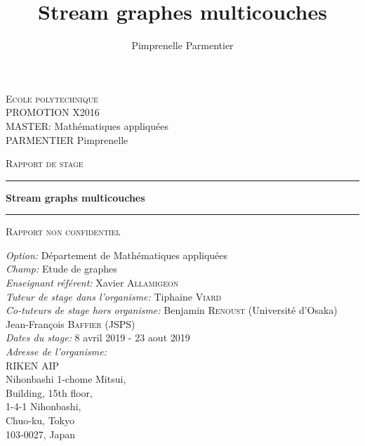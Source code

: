 \documentclass[11pt,a4paper]{article}
\author{Pimprenelle Parmentier}
\title{Stream graphes multicouches}
\theoremstyle{definition}
\theoremstyle{remark}
\theoremstyle{remark}
\def \Stgms {Stream graphs multicouches}
\begin{document}
\begin{titlepage}


\noindent
\textsc{Ecole polytechnique}\\
PROMOTION X2016 \\
MASTER: Mathématiques appliquées\\
PARMENTIER Pimprenelle

\vspace{3cm}
\begin{center}
\textsc{\Large Rapport de stage}
\vspace{1cm}
\hrule %
\vspace{0.4cm}
{\huge \bfseries \Stgms \par}\vspace{0.4cm} %
\hrule 
\vspace{1cm}
\textsc{\Large Rapport non confidentiel}
\vspace{4cm} %
 
\end{center}

\noindent
\textit{Option:} Département de Mathématiques appliquées\\
\textit{Champ:} Etude de graphes\\
\textit{Enseignant référent:} Xavier \textsc{Allamigeon}\\
\textit{Tuteur de stage dans l'organisme:} Tiphaine \textsc{Viard}\\
\textit {Co-tuteurs de stage hors organisme:} Benjamin \textsc{Renoust} (Université d'Osaka)\\
\hspace*{6.1cm} Jean-François \textsc{Baffier} (JSPS)\\
\textit{Dates du stage:} 8 avril 2019 - 23 aout 2019\\
\textit{Adresse de l'organisme:}\\
RIKEN AIP\\
Nihonbashi 1-chome Mitsui,\\
Building, 15th floor,\\
1-4-1 Nihonbashi,\\
Chuo-ku, Tokyo\\
103-0027, Japan\\
\end{titlepage}


\begin{abstract}

	


\end{abstract}
\end{document}
